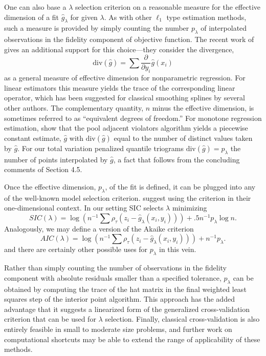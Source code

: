 One can also base a $\lambda$
selection criterion on a reasonable measure for the effective
dimension of a fit $\hat g_\lambda $ for given
$\lambda$. As with other $\ell_1$ type estimation methods, such a
measure is provided by simply counting the number $p_\lambda$ of
interpolated observations in the fidelity component of objective
function. The recent work of  gives an additional
support for this choice---they consider the divergence,
\[ 
\mbox{div} ( \hat g) = \sum \frac{\partial}{\partial y_i} \hat g (x_i)
\]
as a general measure of effective dimension for nonparametric
regression. For linear estimators this measure yields the trace of the
corresponding linear operator, which has been suggested for classical
smoothing splines by several other authors. 
The complementary quantity, $n$ minus the effective dimension, is sometimes
referred to as ``equivalent degrees of freedom.''
For monotone regression
estimation,  show that the pool adjacent violators
algorithm yields a piecewise constant estimate, $\hat g$ with
$\mbox{div} (\hat g)$ equal to the number of distinct values taken by
$\hat g$. For our total variation penalized quantile triograms
$\mbox{div} (\hat g) = p_\lambda$ the number of points interpolated by
$\hat g$, a fact that follows from the concluding comments of Section
4.5.

Once the effective dimension, $p_\lambda$, of the fit is defined, 
it can be plugged into any of the well-known model selection criterion.
 suggest using the  criterion in
their one-dimensional context. In our setting SIC selects $\lambda$ minimizing
\[
SIC(\lambda) = \log ( n^{-1}
\sum \rho_\tau (z_i - \hat g_\lambda (x_i , y_i )) ) + 
.5 n^{-1} p_\lambda \log n.
\]
Analogously, we may define a version of the Akaike criterion 
\[
AIC(\lambda) = \log ( n^{-1}
\sum \rho_\tau (z_i - \hat g_\lambda (x_i , y_i )) ) + 
n^{-1} p_\lambda.
\]
and there are certainly other possible uses for $p_\lambda$ in this vein.


Rather than simply counting the number of observations in the fidelity
component with absolute residuals smaller than a specified tolerance,
$p_\lambda$ can be obtained by computing the trace of the hat matrix
in the final weighted least squares step of the interior point algorithm.
This approach has the added advantage that it suggests a 
linearized form of the generalized cross-validation criterion that can be
used for $\lambda$ selection.
Finally, classical cross-validation is also entirely feasible in small to 
moderate size problems, and further work on computational shortcuts may be able
to extend the range of applicability of these methods.


